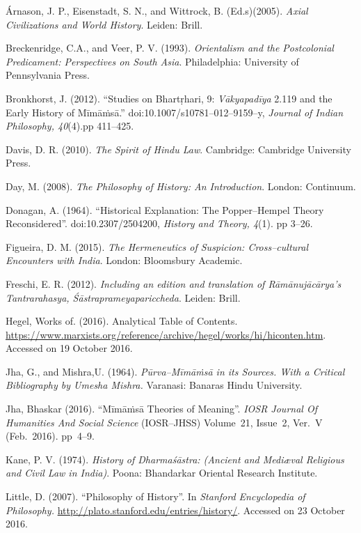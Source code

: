 \begin{thebibliography}{99}
\itemsep=2pt
 Árnason, J. P., Eisenstadt, S. N., and Wittrock, B. (Ed.s)(2005). \textit{Axial Civilizations and World History}. Leiden: Brill.

  Breckenridge, C.A., and Veer, P. V. (1993). \textit{Orientalism and the Postcolonial Predicament: Perspectives on South Asia}. Philadelphia: University of Pennsylvania Press.

  Bronkhorst, J. (2012). “Studies on Bhartṛhari, 9: \textit{Vākyapadīya} 2.119 and the Early History of Mīmāṁsā.” doi:10.1007/s10781–012–9159–y, \textit{Journal of Indian Philosophy, 40}(4).pp 411–425.

  Davis, D. R. (2010). \textit{The Spirit of Hindu Law}. Cambridge: Cambridge University Press.

  Day, M. (2008). \textit{The Philosophy of History: An Introduction}. London: Continuum.

  Donagan, A. (1964). “Historical Explanation: The Popper–Hempel Theory Reconsidered”. doi:10.2307/2504200, \textit{History and Theory, 4}(1). pp 3–26.

  Figueira, D. M. (2015). \textit{The Hermeneutics of Suspicion: Cross–cultural Encounters with India}. London: Bloomsbury Academic.

  Freschi, E. R. (2012). \textit{Including an edition and translation of Rāmānujācārya's Tantrarahasya, Śāstraprameyapariccheda}. Leiden: Brill.

  Hegel, Works of. (2016). Analytical Table of Contents. \url{https://www.marxists.org/reference/archive/hegel/works/hi/hiconten.htm}. Accessed on 19 October 2016.

  Jha, G., and Mishra,U. (1964). \textit{Pūrva–Mīmāṁsā in its Sources. With a Critical Bibliography by Umesha Mishra.} Varanasi: Banaras Hindu University.

  Jha, Bhaskar (2016). “Mīmāṁsā Theories of Meaning”. \textit{IOSR Journal Of Humanities And Social Science} (IOSR–JHSS) Volume~21, Issue~2, Ver.~V (Feb.~2016). pp~4–9.

  Kane, P. V. (1974). \textit{History of Dharmaśāstra: (Ancient and Mediæval Religious and Civil Law in India)}. Poona: Bhandarkar Oriental Research Institute.

  Little, D. (2007). “Philosophy of History”. In \textit{Stanford Encyclopedia of Philosophy.} \url{http://plato.stanford.edu/entries/history/}. Accessed on 23 October 2016.


\end{thebibliography}
